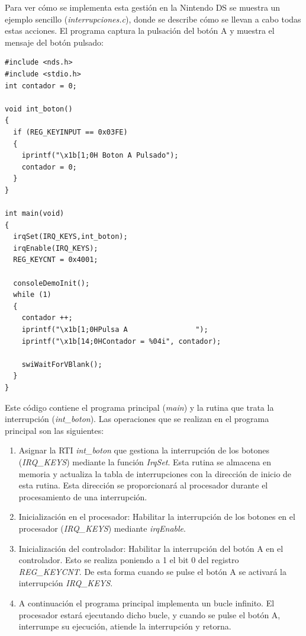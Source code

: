 \begin{example}
Para ver cómo se implementa esta gestión en la Nintendo DS se muestra un ejemplo sencillo (\textit{interrupciones.c}), donde se describe cómo se llevan a cabo todas estas acciones. El programa captura la pulsación del botón A y muestra el mensaje del botón pulsado: 

\begin{lstlisting}
#include <nds.h>
#include <stdio.h>
int contador = 0;

void int_boton() 
{
  if (REG_KEYINPUT == 0x03FE)
  {
    iprintf("\x1b[1;0H Boton A Pulsado");
    contador = 0;
  }
}

int main(void)
{
  irqSet(IRQ_KEYS,int_boton);
  irqEnable(IRQ_KEYS); 
  REG_KEYCNT = 0x4001; 
  
  consoleDemoInit();
  while (1)
  { 
    contador ++;
    iprintf("\x1b[1;0HPulsa A                ");
    iprintf("\x1b[14;0HContador = %04i", contador);

    swiWaitForVBlank();
  }
}
\end{lstlisting}
\end{example}

Este código contiene el programa principal (\textit{main}) y la rutina que trata la interrupción (\textit{int\_boton}). Las operaciones que se realizan en el programa principal son las siguientes:

\begin{enumerate}
	\item   Asignar la RTI \textit{int\_boton} que gestiona la interrupción de los botones (\textit{IRQ\_KEYS}) mediante la función \textit{IrqSet}. Esta rutina se almacena en memoria y actualiza la tabla de interrupciones con la dirección de inicio de esta rutina. Esta dirección se proporcionará al procesador durante el procesamiento de una interrupción. 
	\item Inicialización en el procesador: Habilitar la interrupción de los botones en el procesador (\textit{IRQ\_KEYS}) mediante \textit{irqEnable}.
	\item Inicialización del controlador: Habilitar la interrupción del botón A en el controlador. Esto se realiza poniendo a 1 el bit 0 del registro \textit{REG\_KEYCNT}. De esta forma cuando se pulse el botón A se activará la interrupción \textit{IRQ\_KEYS}. 
	\item A continuación el programa principal implementa un bucle infinito. El procesador estará ejecutando dicho bucle, y cuando se pulse el botón A, interrumpe su ejecución, atiende la interrupción y retorna. 
\end{enumerate}

